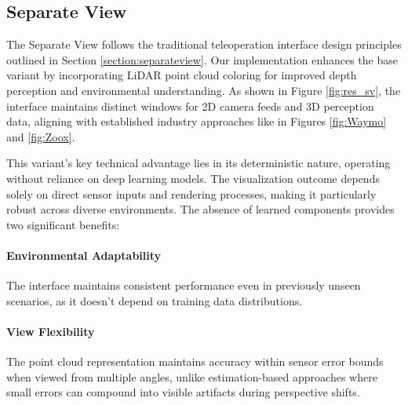 \subsection*{Separate View}

The Separate View follows the traditional teleoperation interface design principles outlined in Section \ref{section:separateview}. Our implementation enhances the base variant by incorporating \ac{LiDAR} point cloud coloring for improved depth perception and environmental understanding. As shown in Figure \ref{fig:res_sv}, the interface maintains distinct windows for 2D camera feeds and 3D perception data, aligning with established industry approaches like in Figures \ref{fig:Waymo} and \ref{fig:Zoox}.

This variant's key technical advantage lies in its deterministic nature, operating without reliance on deep learning models. The visualization outcome depends solely on direct sensor inputs and rendering processes, making it particularly robust across diverse environments. The absence of learned components provides two significant benefits:
\paragraph{Environmental Adaptability}
The interface maintains consistent performance even in previously unseen scenarios, as it doesn't depend on training data distributions.
\paragraph{View Flexibility}
The point cloud representation maintains accuracy within sensor error bounds when viewed from multiple angles, unlike estimation-based approaches where small errors can compound into visible artifacts during perspective shifts.

